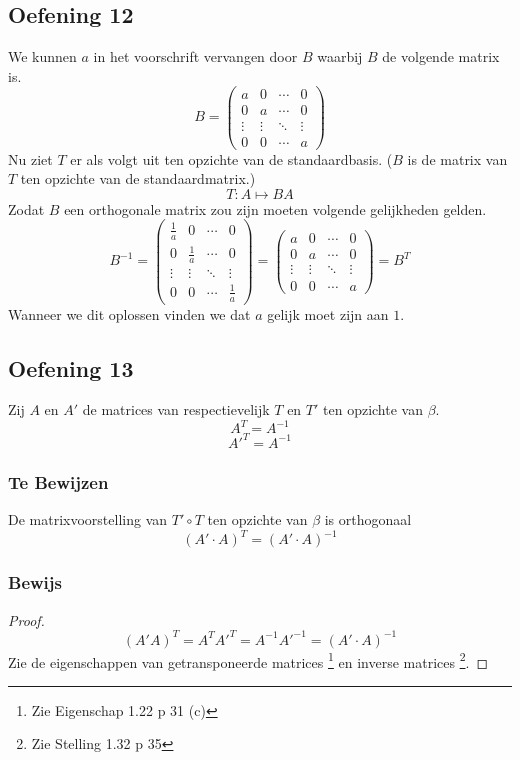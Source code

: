 \documentclass[lineaire_algebra_oplossingen.tex]{subfiles}
\begin{document}
\subsection{Oefening 12}
We kunnen $a$ in het voorschrift vervangen door $B$ waarbij $B$ de volgende matrix is.
\[
B=
\begin{pmatrix}
a & 0 & \cdots & 0\\
0 & a & \cdots & 0\\
\vdots & \vdots& \ddots & \vdots\\
0 & 0 & \cdots & a
\end{pmatrix}
\]
Nu ziet $T$ er als volgt uit ten opzichte van de standaardbasis. ($B$ is de matrix van $T$ ten opzichte van de standaardmatrix.)
\[
T: A \mapsto BA
\]
Zodat $B$ een orthogonale matrix zou zijn moeten volgende gelijkheden gelden.
\[
B^{-1}=
\begin{pmatrix}
\frac{1}{a} & 0 & \cdots & 0\\
0 & \frac{1}{a} & \cdots & 0\\
\vdots & \vdots& \ddots & \vdots\\
0 & 0 & \cdots & \frac{1}{a}
\end{pmatrix}
=
\begin{pmatrix}
a & 0 & \cdots & 0\\
0 & a & \cdots & 0\\
\vdots & \vdots& \ddots & \vdots\\
0 & 0 & \cdots & a
\end{pmatrix}
= B^T
\]
Wanneer we dit oplossen vinden we dat $a$ gelijk moet zijn aan $1$.

\subsection*{Oefening 13}
Zij $A$ en $A'$ de matrices van respectievelijk $T$ en $T'$ ten opzichte van $\beta$.
\[
A^T = A^{-1}
\]
\[
A'^T = A^{-1}
\]

\subsubsection*{Te Bewijzen}
De matrixvoorstelling van $T'\circ T$ ten opzichte van $\beta$ is orthogonaal
\[
(A'\cdot A)^T = (A'\cdot A)^{-1} 
\]

\subsubsection*{Bewijs}
\begin{proof}
\[
(A'A)^T = A^TA'^T = A^{-1}A'^{-1} = (A'\cdot A)^{-1} 
\]
Zie de eigenschappen van getransponeerde matrices \footnote{Zie Eigenschap 1.22 p 31 (c)} en inverse matrices \footnote{Zie Stelling 1.32 p 35}.
\end{proof}
\end{document}
